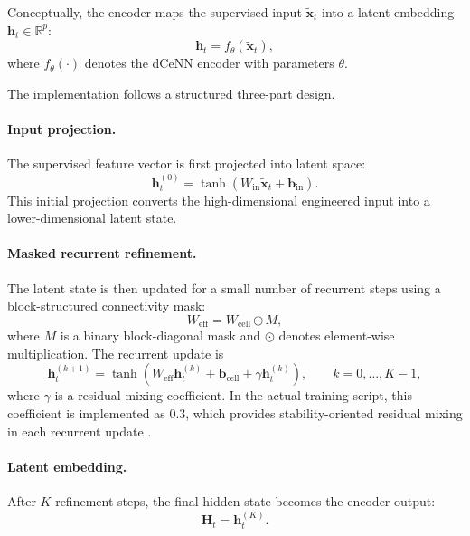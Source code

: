 Conceptually, the encoder maps the supervised input $\tilde{\mathbf{x}}_t$ into a latent embedding $\mathbf{h}_t \in \mathbb{R}^{p}$:
\begin{equation}
	\mathbf{h}_t = f_{\theta}\!\left(\tilde{\mathbf{x}}_t\right),
	\label{eq:dcenn_map}
\end{equation}
where $f_{\theta}(\cdot)$ denotes the dCeNN encoder with parameters $\theta$.

The implementation follows a structured three-part design.

\paragraph{Input projection.}
The supervised feature vector is first projected into latent space:
\begin{equation}
	\mathbf{h}_t^{(0)} = \tanh\!\left(W_{\mathrm{in}}\tilde{\mathbf{x}}_t + \mathbf{b}_{\mathrm{in}}\right).
	\label{eq:dcenn_input_proj}
\end{equation}
This initial projection converts the high-dimensional engineered input into a lower-dimensional latent state.

\paragraph{Masked recurrent refinement.}
The latent state is then updated for a small number of recurrent steps using a block-structured connectivity mask:
\begin{equation}
	W_{\mathrm{eff}} = W_{\mathrm{cell}} \odot M,
	\label{eq:dcenn_weff}
\end{equation}
where $M$ is a binary block-diagonal mask and $\odot$ denotes element-wise multiplication. The recurrent update is
\begin{equation}
	\mathbf{h}_t^{(k+1)}
	=
	\tanh\!\left(
	W_{\mathrm{eff}}\mathbf{h}_t^{(k)} + \mathbf{b}_{\mathrm{cell}} + \gamma \mathbf{h}_t^{(k)}
	\right),
	\qquad k=0,\dots,K-1,
	\label{eq:dcenn_recurrence}
\end{equation}
where $\gamma$ is a residual mixing coefficient. In the actual training script, this coefficient is implemented as $0.3$, which provides stability-oriented residual mixing in each recurrent update \cite{repo_thesis_grid_anomaly}.

\paragraph{Latent embedding.}
After $K$ refinement steps, the final hidden state becomes the encoder output:
\begin{equation}
	\mathbf{H}_t = \mathbf{h}_t^{(K)}.
	\label{eq:dcenn_embedding}
\end{equation}

